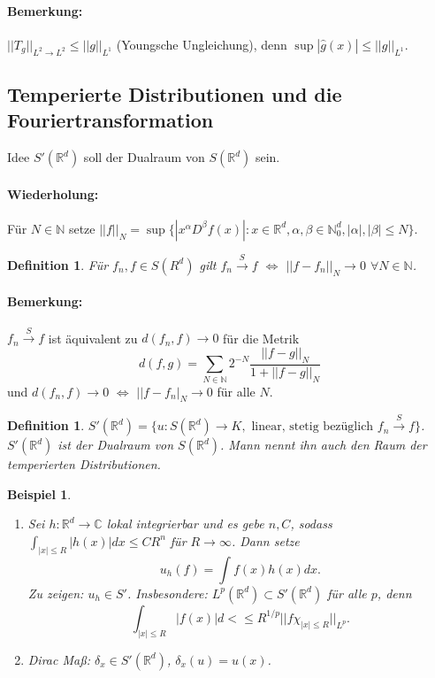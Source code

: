 \documentclass[12pt,a4paper,titlepage]{scrartcl}
\newtheorem{Definition}[Satz]{Definition}
\newtheorem{Beispiel}[Satz]{Beispiel}
\numberwithin{equation}{section}
\newcommand{\C}{\mathbb{C}} %
\newcommand{\R}{\mathbb{R}} %
\newcommand{\N}{\mathbb{N}} %
\newcommand{\g}{\hat{g}}
\begin{document}
	\paragraph{Bemerkung:} $||T_g||_{L^2\rightarrow L^2}\leq||g||_{L^1}$ (Youngsche Ungleichung), denn $\sup|\g(x)| \leq ||g||_{L^1}$.
	
	\subsection{Temperierte Distributionen und die Fouriertransformation}
	
	Idee $S'(\R^d)$ soll der Dualraum von $S(\R^d)$ sein. 
	\paragraph{Wiederholung:} Für $N\in \N$ setze $||f||_N = \sup\{|x^\alpha D^\beta f(x)|: x\in \R^d, \alpha,\beta\in \N_0^d, |\alpha|,|\beta|\leq N \}$.
	
	\begin{Definition}
		Für $f_n,f\in S(R^d)$ gilt $f_n\overset{S}{\rightarrow}f$ $\Leftrightarrow$ $||f-f_n||_N\rightarrow 0$ $\forall N\in \N$.
	\end{Definition}
	
	\paragraph{Bemerkung:} $f_n\overset{S}{\rightarrow} f$ ist äquivalent zu $d(f_n,f)\rightarrow 0$ für die Metrik
	$$d(f,g)=\sum_{N\in \N}2^{-N}\frac{||f-g||_N}{1+||f-g||_N}$$
	und $d(f_n,f)\rightarrow 0$ $\Leftrightarrow$ $||f-f_n|_N\rightarrow 0$ für alle $N$.
	
	\begin{Definition}
		$S'(\R^d) = \{u:S(\R^d)\rightarrow K, \text{ linear, stetig bezüglich } f_n\overset{S}{\rightarrow} f \}$. $S'(\R^d)$ ist der Dualraum von $S(\R^d)$. Mann nennt ihn auch den Raum der temperierten Distributionen.
	\end{Definition}
	
	\begin{Beispiel}
		~
		\begin{enumerate}
			\item[a)] Sei $h:\R^d\rightarrow \C$ lokal integrierbar und es gebe $n,C$, sodass $\int_{|x|\leq R}|h(x)|dx\leq C R^n$ für $R\rightarrow \infty$. Dann setze $$u_h(f) = \int f(x)h(x) dx.$$
			Zu zeigen: $u_h\in S'$. Insbesondere: $L^p(\R^d)\subset S'(\R^d)$ für alle $p$, denn 
			$$\int_{|x|\leq R}|f(x)|d<\leq R^{1/p}||f\chi_{|x|\leq R}||_{L^p}.$$
			\item[b)] Dirac Maß: $\delta_x\in S'(\R^d)$, $\delta_x(u) = u(x)$.
		\end{enumerate}
	\end{Beispiel}
	
\end{document}
